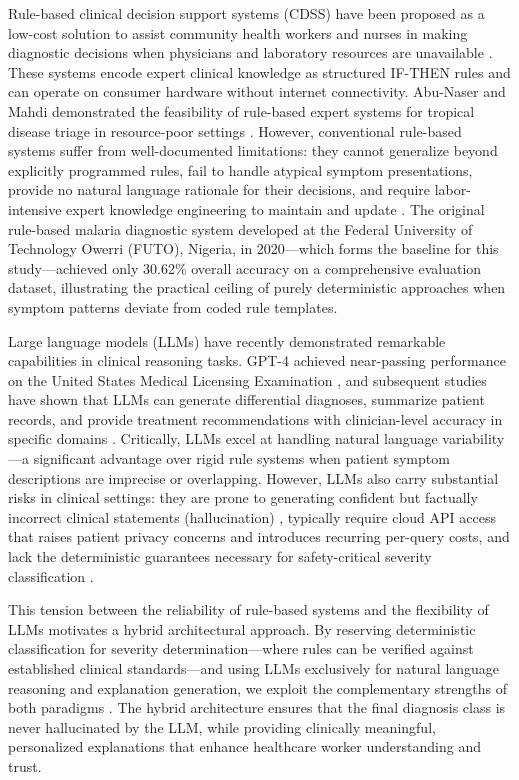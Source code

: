 \documentclass[12pt,a4paper]{article}
\begin{document}
Rule-based clinical decision support systems (CDSS) have been proposed as a low-cost solution to assist community health workers and nurses in making diagnostic decisions when physicians and laboratory resources are unavailable \cite{ref7}. These systems encode expert clinical knowledge as structured IF-THEN rules and can operate on consumer hardware without internet connectivity. Abu-Naser and Mahdi demonstrated the feasibility of rule-based expert systems for tropical disease triage in resource-poor settings \cite{ref14}. However, conventional rule-based systems suffer from well-documented limitations: they cannot generalize beyond explicitly programmed rules, fail to handle atypical symptom presentations, provide no natural language rationale for their decisions, and require labor-intensive expert knowledge engineering to maintain and update \cite{ref7}. The original rule-based malaria diagnostic system developed at the Federal University of Technology Owerri (FUTO), Nigeria, in 2020---which forms the baseline for this study---achieved only 30.62\% overall accuracy on a comprehensive evaluation dataset, illustrating the practical ceiling of purely deterministic approaches when symptom patterns deviate from coded rule templates.

Large language models (LLMs) have recently demonstrated remarkable capabilities in clinical reasoning tasks. GPT-4 achieved near-passing performance on the United States Medical Licensing Examination \cite{ref5}, and subsequent studies have shown that LLMs can generate differential diagnoses, summarize patient records, and provide treatment recommendations with clinician-level accuracy in specific domains \cite{ref1,ref3,ref15}. Critically, LLMs excel at handling natural language variability---a significant advantage over rigid rule systems when patient symptom descriptions are imprecise or overlapping. However, LLMs also carry substantial risks in clinical settings: they are prone to generating confident but factually incorrect clinical statements (hallucination) \cite{ref22}, typically require cloud API access that raises patient privacy concerns and introduces recurring per-query costs, and lack the deterministic guarantees necessary for safety-critical severity classification \cite{ref20}.

This tension between the reliability of rule-based systems and the flexibility of LLMs motivates a hybrid architectural approach. By reserving deterministic classification for severity determination---where rules can be verified against established clinical standards---and using LLMs exclusively for natural language reasoning and explanation generation, we exploit the complementary strengths of both paradigms \cite{ref12}. The hybrid architecture ensures that the final diagnosis class is never hallucinated by the LLM, while providing clinically meaningful, personalized explanations that enhance healthcare worker understanding and trust.
\end{document}
